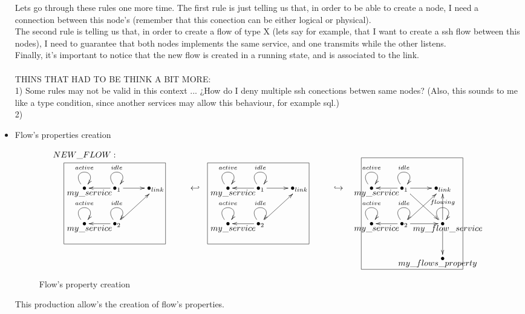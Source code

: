 \documentclass[envcountsect,runningheads]{llncs}
\begin{document}
\begin{itemize}
  Lets go through these rules one more time. The first rule is just telling us that, in order to be 
  able to
  create a node, I need a connection between this node's (remember that this conection can be either
  logical or physical).\\
  The second rule is telling us that, in order to create a flow of type X (lets say for example, 
  that I want to create a ssh flow between this nodes), I need to guarantee that 
  both nodes implements the same service, and one transmits while the other 
  listens.\\
  Finally, it's important to notice that the new flow is created in a running state, 
  and is associated to the link. \\
  \\
  THINS THAT HAD TO BE THINK A BIT MORE: \\
  1) Some rules may not be valid in this context ... ¿How do I deny multiple ssh 
  conections betwen same nodes? (Also, this sounds to me like a type condition, since another
  services may allow this behaviour, for example sql.) \\
  2) 
 
  \item Flow's properties creation
  \begin{figure}[H]
    \[
       \xymatrix@C=25pt@R=30pt
       {
         {}\POS[]-<0pc,0pc>\drop{NEW\_FLOW:}
         \\
         {\bullet}\ar@(ul,ur)^{active} \POS[]-<-.5pc,.5pc> \drop{my\_service} &
         {\bullet}_{1}\ar@(ul,ur)^{idle}\ar@{->}[l]\ar@{->}[r] &
         {\bullet}_{link}
         & {\hookleftarrow} & 
         {\bullet}\ar@(ul,ur)^{active} \POS[]-<-.5pc,.5pc> \drop{my\_service} &
         {\bullet}_{1}\ar@(ul,ur)^{idle}\ar@{->}[l]\ar@{->}[r] &
         {\bullet}_{link} 
         & {\hookrightarrow} & 
         {\bullet}\ar@(ul,ur)^{active} \POS[]-<-.5pc,.5pc> \drop{my\_service} &
         {\bullet}_{1}\ar@(ul,ur)^{idle}\ar@{->}[l]\ar@{->}[r]\ar@{->}[dr] &
         {\bullet}_{link}
         \\
         {\bullet}\ar@(ul,ur)^{active}\POS[]-<-.5pc,.5pc> \drop{my\_service} \POS[]+<3pc,2pc>*+=<10pc,8pc>[F-]{} &
         {\bullet}_{2}\ar@(ul,ur)^{idle}\ar@{->}[l]\ar@{->}[ur]
         & & &
         {\bullet}\ar@(ul,ur)^{active}\POS[]-<-.5pc,.5pc> \drop{my\_service} \POS[]+<3pc,2pc>*+=<10pc,8pc>[F-]{} &
         {\bullet}_{2}\ar@(ul,ur)^{idle}\ar@{->}[l]\ar@{->}[ur]
         & & &
        {\bullet}\ar@(ul,ur)^{active}\POS[]-<-.5pc,.5pc> \drop{my\_service} \POS[]+<3pc,2pc>*+=<10pc,8pc>[]{} &
         {\bullet}_{2}\ar@(ul,ur)^{idle}\ar@{->}[l]\ar@{->}[ur]\ar@{->}[r] &
         {\bullet}\ar@(ul,ur)^{flowing}\ar@{->}[u]\ar@{->}[d] \POS[]+<-3pc,1pc>*+=<10pc,11pc>[F-]{} 
         \POS[]-<-.5pc,.5pc>\drop{my\_flow\_service}
         \\\
         & & & & & & & & & &{\bullet}\POS[]-<.5pc,.5pc> \drop{my\_flows\_property}
      }
    \]
    \caption{Flow's property creation}
    \protect\label{fig:flowpropertycreation}
  \end{figure}
  This production allow's the creation of flow's properties.\\
  

\end{itemize}
\end{document}
